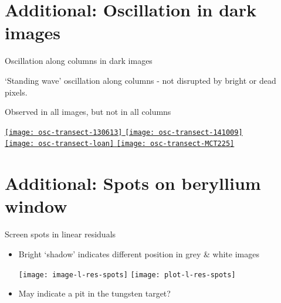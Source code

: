 \documentclass[8pt]{beamer}
\begin{document}





	


\appendix


\section{Additional: Oscillation in dark images}

\begin{frame}[label = ms-res-supplemental]{Oscillation along columns in dark images}

	`Standing wave' oscillation along columns - not disrupted by bright or dead pixels.
	
	Observed in all images, but not in all columns
	
	\hyperlink{ms-res}{
	\texttt{[image: osc-transect-130613]}	
	\texttt{[image: osc-transect-141009]}	
	\\
	\texttt{[image: osc-transect-loan]}	
	\texttt{[image: osc-transect-MCT225]}	
	}
\end{frame}

\section{Additional: Spots on beryllium window}


\begin{frame}[label = app-screen-spots]{Screen spots in linear residuals}

	\begin{itemize}
		\item Bright `shadow' indicates different position in grey \& white images
	\begin{center}
		\texttt{[image: image-l-res-spots]}
		\texttt{[image: plot-l-res-spots]}
	\end{center}
		\item May indicate a pit in the tungsten target?
	\end{itemize}
	
	\hyperlink{screen-spots}{}	
\end{frame}
\end{document}
